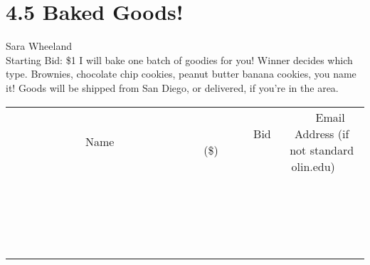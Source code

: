 \documentclass[11pt]{article}
\begin{document}
\section*{4.5 Baked Goods!}
Sara Wheeland
\\
Starting Bid: \$1
\newline
I will bake one batch of goodies for you!  Winner decides which type.  Brownies, chocolate chip cookies, peanut butter banana cookies, you name it!  Goods will be shipped from San Diego, or delivered, if you're in the area.
\\[3ex]
\begin{tabular}{c c c}
~~~~~~~~~~~~~Name~~~~~~~~~~~~~ & ~~~~~~~~~Bid (\$)~~~~~~~~~  & ~~~Email Address (if not standard olin.edu)~~~\\
 & & \\
\hline
 & & \\
\hline
 & & \\
\hline
 & & \\
\hline
 & & \\
\hline
 & & \\
\hline
 & & \\
\hline
 & & \\
\hline
 & & \\
\hline
 & & \\
\hline
 & & \\
\hline
 & & \\
\hline
 & & \\
\hline
 & & \\
\hline
 & & \\
\hline
 & & \\
\hline
 & & \\
\hline
 & & \\
\hline
 & & \\
\hline
\end{tabular}
\newpage
\end{document}
